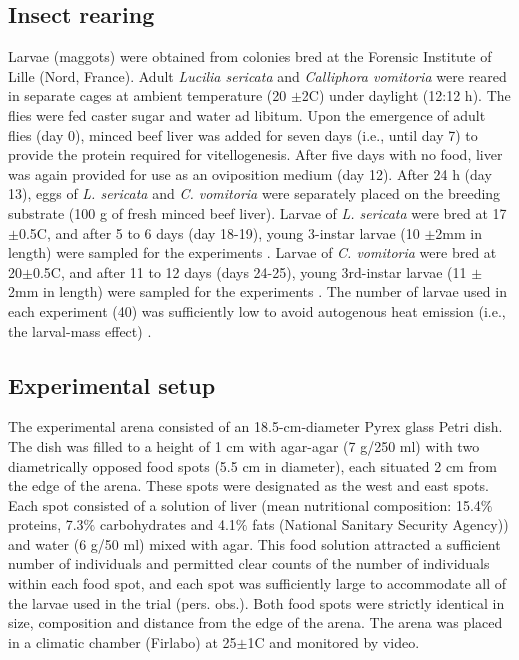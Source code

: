 		\subsection{Insect rearing}
Larvae (maggots) were obtained from colonies bred at the Forensic Institute of Lille (Nord, France). Adult \textit{Lucilia sericata} and \textit{Calliphora vomitoria} were reared in separate cages at ambient temperature (20 $\pm$2C) under daylight (12:12 h). The flies were fed caster sugar and water ad libitum. Upon the emergence of adult flies (day 0), minced beef liver was added for seven days (i.e., until day 7) to provide the protein required for vitellogenesis. After five days with no food, liver was again provided for use as an oviposition medium (day 12). After 24 h (day 13), eggs of \textit{L. sericata} and \textit{C. vomitoria} were separately placed on the breeding substrate (100 g of fresh minced beef liver). Larvae of \textit{L. sericata} were bred at 17$\pm$0.5C, and after 5 to 6 days (day 18-19), young 3-instar larvae (10 $\pm$2mm in length) were sampled for the experiments \cite{grassberger_effect_2001}. Larvae of \textit{C. vomitoria} were bred at 20$\pm$0.5C, and after 11 to 12 days (days 24-25), young 3rd-instar larvae (11 $\pm$2mm in length) were sampled for the experiments \cite{ames_low_2003}. The number of larvae used in each experiment (40) was sufficiently low to avoid autogenous heat emission (i.e., the larval-mass effect) \citep{charabidze_larval-mass_2011,heaton_quantifying_2014}.
    

		\subsection{Experimental setup}
The experimental arena consisted of an 18.5-cm-diameter Pyrex glass Petri dish. The dish was filled to a height of 1 cm with agar-agar (7 g/250 ml) with two diametrically opposed food spots (5.5 cm in diameter), each situated 2 cm from the edge of the arena. These spots were designated as the west and east spots. Each spot consisted of a solution of liver (mean nutritional composition: 15.4$\%$ proteins, 7.3$\%$ carbohydrates and 4.1$\%$ fats (National Sanitary Security Agency)) and water (6 g/50 ml) mixed with agar. This food solution attracted a sufficient number of individuals and permitted clear counts of the number of individuals within each food spot, and each spot was sufficiently large to accommodate all of the larvae used in the trial (pers. obs.). Both food spots were strictly identical in size, composition and distance from the edge of the arena. The arena was placed in a climatic chamber (Firlabo) at 25$\pm$1C and monitored by video.
	
